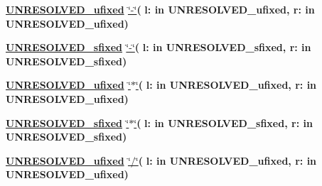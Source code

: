 \begin{DoxyCompactItemize}
\item 
{\bfseries {\bfseries {\bfseries \hyperlink{classfixed__pkg_ae78bc2b36d22f6abeac163955e8a587d}{U\+N\+R\+E\+S\+O\+L\+V\+E\+D\+\_\+ufixed}} \textcolor{vhdlchar}{ }}} \hyperlink{classfixed__pkg_aa5b0e6d3b75f03dea7c3a4daedc04027}{\char`\"{}-\/\char`\"{}}{\bfseries  ( }{\bfseries \textcolor{vhdlchar}{l\+: }\textcolor{stringliteral}{in }\textcolor{vhdlchar}{U\+N\+R\+E\+S\+O\+L\+V\+E\+D\+\_\+ufixed}}{\bfseries  , \textcolor{vhdlchar}{r\+: }\textcolor{stringliteral}{in }\textcolor{vhdlchar}{U\+N\+R\+E\+S\+O\+L\+V\+E\+D\+\_\+ufixed}}{\bfseries  )} 
\item 
{\bfseries {\bfseries {\bfseries \hyperlink{classfixed__pkg_aa723b28a027c3c0f9bca02d75e8df4d6}{U\+N\+R\+E\+S\+O\+L\+V\+E\+D\+\_\+sfixed}} \textcolor{vhdlchar}{ }}} \hyperlink{classfixed__pkg_aa50f5cd3a12ba1cca2c9579edce09042}{\char`\"{}-\/\char`\"{}}{\bfseries  ( }{\bfseries \textcolor{vhdlchar}{l\+: }\textcolor{stringliteral}{in }\textcolor{vhdlchar}{U\+N\+R\+E\+S\+O\+L\+V\+E\+D\+\_\+sfixed}}{\bfseries  , \textcolor{vhdlchar}{r\+: }\textcolor{stringliteral}{in }\textcolor{vhdlchar}{U\+N\+R\+E\+S\+O\+L\+V\+E\+D\+\_\+sfixed}}{\bfseries  )} 
\item 
{\bfseries {\bfseries {\bfseries \hyperlink{classfixed__pkg_ae78bc2b36d22f6abeac163955e8a587d}{U\+N\+R\+E\+S\+O\+L\+V\+E\+D\+\_\+ufixed}} \textcolor{vhdlchar}{ }}} \hyperlink{classfixed__pkg_a29826fcafea88257a94a5fcc9ededcba}{\char`\"{}$\ast$\char`\"{}}{\bfseries  ( }{\bfseries \textcolor{vhdlchar}{l\+: }\textcolor{stringliteral}{in }\textcolor{vhdlchar}{U\+N\+R\+E\+S\+O\+L\+V\+E\+D\+\_\+ufixed}}{\bfseries  , \textcolor{vhdlchar}{r\+: }\textcolor{stringliteral}{in }\textcolor{vhdlchar}{U\+N\+R\+E\+S\+O\+L\+V\+E\+D\+\_\+ufixed}}{\bfseries  )} 
\item 
{\bfseries {\bfseries {\bfseries \hyperlink{classfixed__pkg_aa723b28a027c3c0f9bca02d75e8df4d6}{U\+N\+R\+E\+S\+O\+L\+V\+E\+D\+\_\+sfixed}} \textcolor{vhdlchar}{ }}} \hyperlink{classfixed__pkg_a12861e11afd1cb6346d3bab7f8e71b9c}{\char`\"{}$\ast$\char`\"{}}{\bfseries  ( }{\bfseries \textcolor{vhdlchar}{l\+: }\textcolor{stringliteral}{in }\textcolor{vhdlchar}{U\+N\+R\+E\+S\+O\+L\+V\+E\+D\+\_\+sfixed}}{\bfseries  , \textcolor{vhdlchar}{r\+: }\textcolor{stringliteral}{in }\textcolor{vhdlchar}{U\+N\+R\+E\+S\+O\+L\+V\+E\+D\+\_\+sfixed}}{\bfseries  )} 
\item 
{\bfseries {\bfseries {\bfseries \hyperlink{classfixed__pkg_ae78bc2b36d22f6abeac163955e8a587d}{U\+N\+R\+E\+S\+O\+L\+V\+E\+D\+\_\+ufixed}} \textcolor{vhdlchar}{ }}} \hyperlink{classfixed__pkg_a49d0495d91a74b686658a730a25948d1}{\char`\"{}/\char`\"{}}{\bfseries  ( }{\bfseries \textcolor{vhdlchar}{l\+: }\textcolor{stringliteral}{in }\textcolor{vhdlchar}{U\+N\+R\+E\+S\+O\+L\+V\+E\+D\+\_\+ufixed}}{\bfseries  , \textcolor{vhdlchar}{r\+: }\textcolor{stringliteral}{in }\textcolor{vhdlchar}{U\+N\+R\+E\+S\+O\+L\+V\+E\+D\+\_\+ufixed}}{\bfseries  )} 

\end{DoxyCompactItemize}
